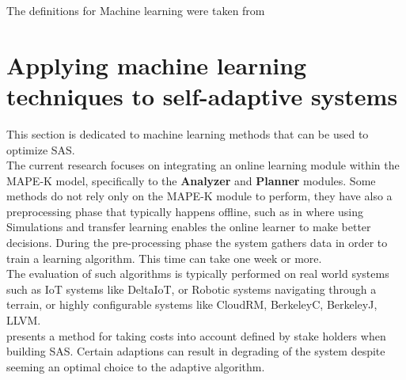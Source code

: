 \documentclass[pdftex,english,oribibl]{llncs}
\begin{document}
{\footnotesize The definitions for Machine learning were taken from \cite{machineLearning}}
\section{Applying machine learning techniques to self-adaptive systems}\label{sec:p2}
This section is dedicated to machine learning methods that can be used to optimize SAS. \\
 The current research focuses on integrating an online learning module within the MAPE-K model, specifically to the \textbf{Analyzer} and \textbf{Planner} modules.  Some methods do not rely only on the MAPE-K module to perform, they have also a preprocessing phase that typically happens offline, such as in \cite{transferLearning} where using Simulations and transfer learning enables the online learner to make better decisions. During the pre-processing phase the system gathers data in order to train a learning algorithm. This time can take one week or more.\\ 
The evaluation of such algorithms is typically performed on real world systems such as IoT systems like DeltaIoT, or Robotic systems navigating through a terrain, or highly configurable systems like CloudRM, BerkeleyC, BerkeleyJ, LLVM.\\
 \cite{decisionMakingSASystems} presents a method for taking costs into account defined by stake holders when building SAS. Certain adaptions can result in degrading of the system despite seeming an optimal choice to the adaptive algorithm.\\
\end{document}
